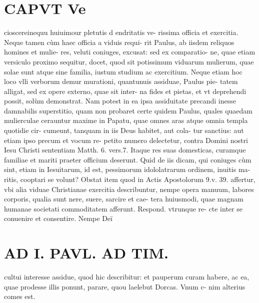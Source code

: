 \documentclass{article}
\begin{document}
\begin{pages}
\section*{CAPVT  Ve }
\marginpar{[ p.261 ]}\pstart cioscereinequu huiuimour pletutis d endritatis ve- rissima officia et exercitia.  \pend\pstart Neque tamen cùm haec officia a viduis requi- rit Paulus, ab iisdem reliquos homines et mulie- res, veluti coniuges, excusat: sed ex comparatio- ne, quae etiam versiculo proximo sequitur, docet, quod sit potissimum viduarum mulierum, quae solae sunt atque sine familia, iustum studium ac exercitium. Neque etiam hoc loco vlli verborum demur murationi, quantunuis assiduae, Paulus pie- tatem alligat, sed ex opere externo, quae sit inter- na fides et pietas, et vt deprehendi possit, solùm demonstrat. Nam potest in ea ipsa assiduitate precandi inesse damnabilis superstitio, quam non probaret certe quidem Paulus, quales quaedam mulierculae cerauntur maxime in Papatu, quae omnes aras atque omnia templa quotidie cir- cumeunt, tanquam in iis Deus habitet, aut cola- tur sanctius: aut etiam ipso precum et vocum re- petito numero delectetur, contra Domini nostri Iesu Christi sententiam Matth. 6. vers.7. Itaque res suas domesticas, curamque familiae et mariti praeter officium deserunt. Quid de iis dicam, qui coniuges cùm sint, etiam in Iesuitarum, id est, pessimorum idololatrarum ordinem, inuitis ma- ritis, cooptari se volunt?  \pend\pstart Obstat item quod in Actis Apostolorum 9.v. 39. affertur, vbi alia viduae Christianae exercitia describuntur, nempe opera manuum, labores corporis, qualia sunt nere, suere, sarcire et cae- tera huiusmodi, quae magnam humanae societati commoditatem afferunt. Respond. vtrunque re- cte inter se conuenire et consentire. Nempe Deï  \pend
\section*{AD I. PAVL. AD TIM. }
\marginpar{[ p.262 ]}\pstart cultui interesse assidue, quod hic describitur: et pauperum curam habere, ac ea, quae prodesse illis ponunt, parare, quou laelebut Dorcas. Vnum c- nim alterius comes est.  \pend
{}
{}

\end{pages}
\end{document}
